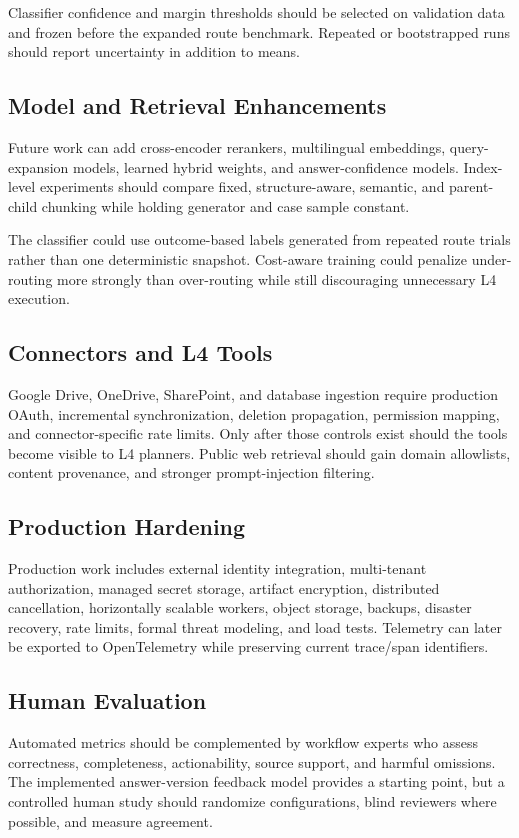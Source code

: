 Classifier confidence and margin thresholds should be selected on validation
data and frozen before the expanded route benchmark. Repeated or bootstrapped
runs should report uncertainty in addition to means.

\subsection{Model and Retrieval Enhancements}

Future work can add cross-encoder rerankers, multilingual embeddings,
query-expansion models, learned hybrid weights, and answer-confidence models.
Index-level experiments should compare fixed, structure-aware, semantic, and
parent-child chunking while holding generator and case sample constant.

The classifier could use outcome-based labels generated from repeated route
trials rather than one deterministic snapshot. Cost-aware training could
penalize under-routing more strongly than over-routing while still discouraging
unnecessary L4 execution.

\subsection{Connectors and L4 Tools}

Google Drive, OneDrive, SharePoint, and database ingestion require production
OAuth, incremental synchronization, deletion propagation, permission mapping,
and connector-specific rate limits. Only after those controls exist should the
tools become visible to L4 planners. Public web retrieval should gain domain
allowlists, content provenance, and stronger prompt-injection filtering.

\subsection{Production Hardening}

Production work includes external identity integration, multi-tenant
authorization, managed secret storage, artifact encryption, distributed
cancellation, horizontally scalable workers, object storage, backups,
disaster recovery, rate limits, formal threat modeling, and load tests.
Telemetry can later be exported to OpenTelemetry while preserving current
trace/span identifiers.

\subsection{Human Evaluation}

Automated metrics should be complemented by workflow experts who assess
correctness, completeness, actionability, source support, and harmful
omissions. The implemented answer-version feedback model provides a starting
point, but a controlled human study should randomize configurations, blind
reviewers where possible, and measure agreement.
